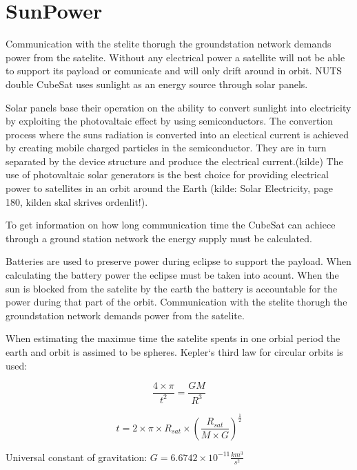 \section{SunPower}

Communication with the stelite thorugh the groundstation network demands power from the satelite. Without any electrical power a satellite will not be able to support its payload or comunicate and will only drift around in orbit. NUTS double CubeSat uses sunlight as an energy source through solar panels. 

Solar panels base their operation on the ability to convert sunlight into electricity by exploiting the photovaltaic effect by using semiconductors. The convertion process where the suns radiation is converted into an electical current is achieved by creating mobile charged particles in the semiconductor. They are in turn separated by the device structure and produce the electrical current.(kilde) The use of photovaltaic solar generators is the best choice for providing electrical power to satellites in an orbit around the Earth (kilde: Solar Electricity, page 180, kilden skal skrives ordenlit!).

To get information on how long communication time the CubeSat can achiece through a ground station network the energy supply must be calculated.

Batteries are used to preserve power during eclipse to support the payload. When calculating the battery power the eclipse must be taken into acount. When the sun is blocked from the satelite by the earth the battery is accountable for the power during that part of the orbit. Communication with the stelite thorugh the groundstation network demands power from the satelite. 

\vspace{5 mm} When estimating the maximue time the satelite spents in one orbial period the earth and orbit is assimed to be spheres. Kepler`s third law for circular orbits is used:

\begin{equation}\frac{4\times\pi}{t^2} = \frac{GM}{R^3}
\label{Kepler`s 3.law}
\end{equation}

\begin{equation}t = 2\times\pi\times R_{sat}\times (\frac{R_{sat}}{M\times G})^{\frac{1}{2}}
\label{Time spent in orbit}
\end{equation}

\vspace{5 mm}Universal constant of gravitation: $G = 6.6742\times 10^{-11} \frac{km^3}{s^2}$

